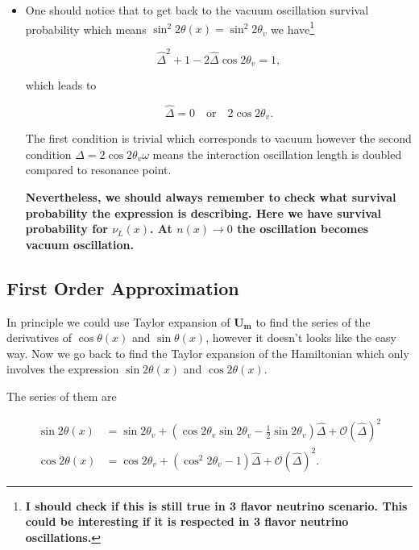 \documentclass{tufte-handout}
\begin{document}
\begin{itemize}
\item
One should notice that to get back to the vacuum oscillation survival probability which means $\sin^2 2\theta(x) = \sin^2 2\theta_v $ we have\footnote{\bf I should check if this is still true in 3 flavor neutrino scenario. This could be interesting if it is respected in 3 flavor neutrino oscillations.}

\begin{equation*}
\hat\Delta^2 + 1 - 2\hat\Delta \cos 2\theta_v = 1,
\end{equation*}

which leads to

\begin{equation*}
\hat\Delta = 0 \quad\text{or}\quad 2\cos 2\theta_v .
\end{equation*}

The first condition is trivial which corresponds to vacuum however the second condition $\Delta = 2\cos 2\theta_v \omega$ means the interaction oscillation length is doubled compared to resonance point.

{\bf{Nevertheless, we should always remember to check what survival probability the expression is describing. Here we have survival probability for $\nu_L(x)$. At $n(x)\to 0$ the oscillation becomes vacuum oscillation.}}

\end{itemize}




\subsection{First Order Approximation}


In principle we could use Taylor expansion of $\mathbf{U_m}$ to find the series of the derivatives of $\cos\theta(x)$ and $\sin\theta(x)$, however it doesn't looks like the easy way. Now we go back to find the Taylor expansion of the Hamiltonian which only involves the expression $\sin 2\theta(x)$ and $\cos 2\theta(x)$.

The series of them are

\begin{align*}
\sin 2\theta(x) & = \sin 2\theta_v + \left( \cos 2\theta_v \sin 2\theta_v - \frac{1}{2}\sin 2\theta_v \right)\hat\Delta + \mathcal{O}(\hat\Delta)^2 \\
\cos 2\theta(x) & = \cos 2\theta_v + \left( \cos^2 2\theta_v - 1 \right) \hat \Delta + \mathcal{O}(\hat\Delta)^2 .
\end{align*}
\end{document}

